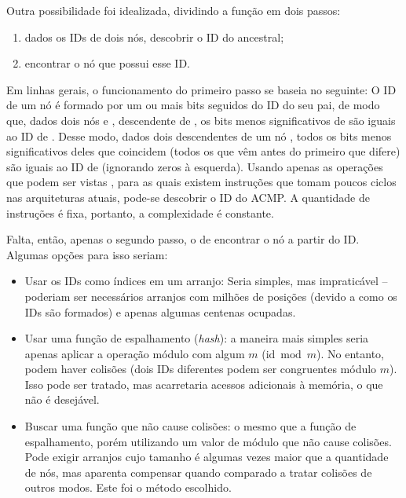 Outra possibilidade foi idealizada, dividindo a função \ACMPIDs em dois passos:
\begin{enumerate}
	\item dados os IDs de dois nós, descobrir o ID do ancestral;
	\item encontrar o nó que possui esse ID.
\end{enumerate}
Em linhas gerais, o funcionamento do primeiro passo se baseia no seguinte:
O ID de um nó é formado por um ou mais bits seguidos do ID do seu pai, de modo que, dados dois nós  e ,  descendente de ,
os bits menos significativos de  são iguais ao ID de .
Desse modo, dados dois descendentes de um nó , todos os bits menos significativos deles que coincidem
(todos os que vêm antes do primeiro que difere) são iguais ao ID de  (ignorando zeros à esquerda).
Usando apenas as operações que podem ser vistas ,
para as quais existem instruções que tomam poucos ciclos nas arquiteturas atuais, pode-se descobrir o ID do ACMP.
A quantidade de instruções é fixa, portanto, a complexidade é constante.


Falta, então, apenas o segundo passo, o de encontrar o nó a partir do ID.
Algumas opções para isso seriam:
\begin{itemize}
	\item Usar os IDs como índices em um arranjo: Seria simples, mas impraticável -- poderiam ser necessários arranjos com milhões de posições (devido a como os IDs são formados) e apenas algumas centenas ocupadas.
	\item Usar uma função de espalhamento (\textit{hash}): a maneira mais simples seria apenas aplicar a operação módulo com algum $m$ ($\mathrm{id} \bmod m$).
	No entanto, podem haver colisões (dois IDs diferentes podem ser congruentes módulo $m$).
	Isso pode ser tratado, mas acarretaria acessos adicionais à memória, o que não é desejável.
	\item Buscar uma função que não cause colisões: o mesmo que a função de espalhamento, porém utilizando um valor de módulo que não cause colisões.
	Pode exigir arranjos cujo tamanho é algumas vezes maior que a quantidade de nós, mas aparenta compensar quando comparado a tratar colisões de outros modos.
	Este foi o método escolhido.
\end{itemize}

